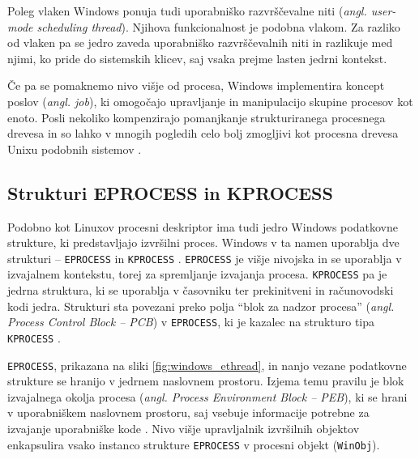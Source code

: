 \documentclass[a4paper,12pt,openright]{book}
\begin{document}
Poleg vlaken Windows ponuja tudi uporabniško razvrščevalne niti (\textit{angl. user-mode scheduling thread}).
Njihova funkcionalnost je podobna vlakom.
Za razliko od vlaken pa se jedro zaveda uporabniško razvrščevalnih niti in razlikuje med njimi, ko pride do sistemskih klicev, saj vsaka prejme lasten jedrni kontekst.

Če pa se pomaknemo nivo višje od procesa, Windows implementira koncept poslov (\textit{angl. job}), ki omogočajo upravljanje in manipulacijo skupine procesov kot enoto.
Posli nekoliko kompenzirajo pomanjkanje strukturiranega procesnega drevesa in so lahko v mnogih pogledih celo bolj zmogljivi kot procesna drevesa Unixu podobnih sistemov \cite{Yosifovich_Russinovich_Solomon_Ionescu_2017}.

\subsection{Strukturi EPROCESS in KPROCESS} \label{ssec:windows_process:eprocess}

Podobno kot Linuxov procesni deskriptor ima tudi jedro Windows podatkovne strukture, ki predstavljajo izvršilni proces.
Windows v ta namen uporablja dve strukturi -- \texttt{EPROCESS} in \texttt{KPROCESS} \cite{Yosifovich_Russinovich_Solomon_Ionescu_2017}.
\texttt{EPROCESS} je višje nivojska in se uporablja v izvajalnem kontekstu, torej za spremljanje izvajanja procesa.
\texttt{KPROCESS} pa je jedrna struktura, ki se uporablja v časovniku ter prekinitveni in računovodski kodi jedra.
Strukturi sta povezani preko polja ``blok za nadzor procesa'' (\textit{angl. Process Control Block -- PCB}) v \texttt{EPROCESS}, ki je kazalec na strukturo tipa \texttt{KPROCESS} \cite{Yosifovich_Russinovich_Solomon_Ionescu_2017}.

\texttt{EPROCESS}, prikazana na sliki \ref{fig:windows_ethread}, in nanjo vezane podatkovne strukture se hranijo v jedrnem naslovnem prostoru.
Izjema temu pravilu je blok izvajalnega okolja procesa (\textit{angl. Process Environment Block -- PEB}), ki se hrani v uporabniškem naslovnem prostoru, saj vsebuje informacije potrebne za izvajanje uporabniške kode \cite{Yosifovich_Russinovich_Solomon_Ionescu_2017}.
Nivo višje upravljalnik izvršilnih objektov enkapsulira vsako instanco strukture \texttt{EPROCESS} v procesni objekt (\texttt{WinObj}).
\end{document}
